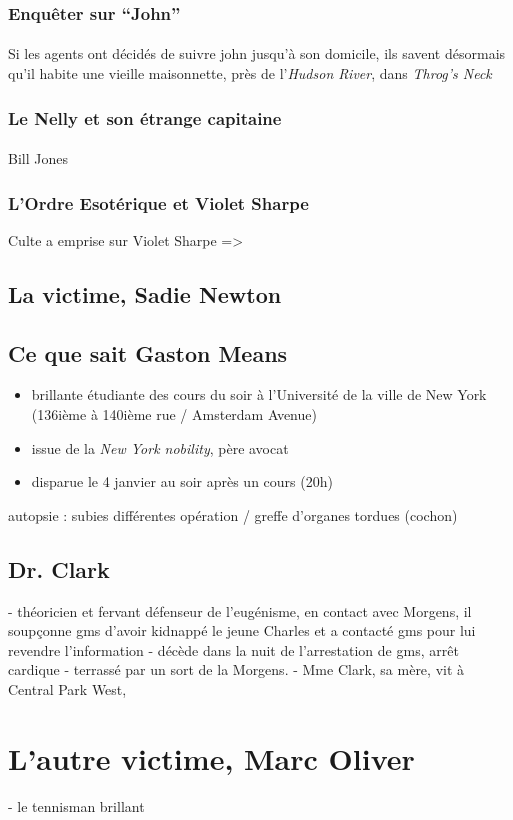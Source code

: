 

\subsubsection{Enquêter sur ``John''}

\paragraph{} Si les agents ont décidés de suivre \gls{john} jusqu'à son domicile, ils savent désormais qu'il habite une vieille maisonnette, près
de l'\emph{Hudson River}, dans \emph{Throg's Neck}

\subsubsection{Le Nelly et son étrange capitaine}
\paragraph{} Bill Jones



\subsubsection{L'Ordre Esotérique et Violet Sharpe}
 Culte a emprise sur Violet Sharpe => 

\subsection{La victime, Sadie Newton}

\subsection{Ce que sait Gaston Means}

\begin{itemize}
 \item brillante étudiante des cours du soir à l'Université de la ville de New York (136ième à 140ième rue / Amsterdam Avenue)
 \item issue de la \emph{New York nobility}, père avocat 
 \item disparue le 4 janvier au soir après un cours (20h)
\end{itemize}

autopsie : subies différentes opération / greffe d'organes tordues (cochon) 

\subsection{Dr. Clark}
- théoricien et fervant défenseur de l'eugénisme, en contact avec Morgens, il soupçonne \gls{gms} d'avoir kidnappé le jeune Charles et a 
contacté \gls{gms} pour lui revendre l'information
- décède dans la nuit de l'arrestation de \gls{gms}, arrêt cardique - terrassé par un sort de la Morgens.
- Mme Clark, sa mère, vit à Central Park West, 
\section{L'autre victime, Marc Oliver}
- le tennisman brillant 